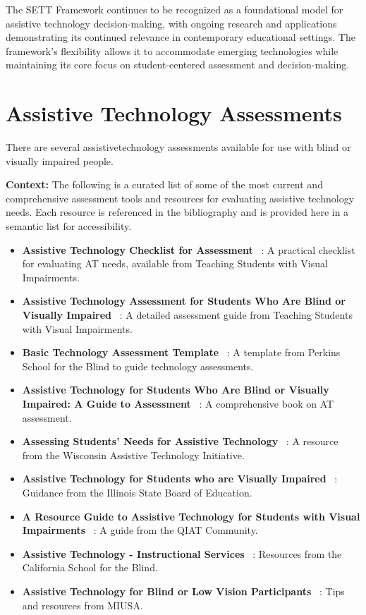 The SETT Framework continues to be recognized as a foundational model for assistive technology decision-making, with ongoing research and applications demonstrating its continued relevance in contemporary educational settings. The framework's flexibility allows it to accommodate emerging technologies while maintaining its core focus on student-centered assessment and decision-making.

\section{Assistive Technology Assessments}\label{app3:trouble4}
There are several \gls{assistivetechnology} assessments available for use with blind or visually impaired people.

\noindent
\textbf{Context:} The following is a curated list of some of the most current and comprehensive assessment tools and resources for evaluating assistive technology needs. Each resource is referenced in the bibliography and is provided here in a semantic list for accessibility.

\begin{itemize}
	\item \textbf{Assistive Technology Checklist for Assessment}~ \supercite{SnowChecklist}: A practical checklist for evaluating AT needs, available from Teaching Students with Visual Impairments.
	\item \textbf{Assistive Technology Assessment for Students Who Are Blind or Visually Impaired}~ \supercite{TeachingAssessment}: A detailed assessment guide from Teaching Students with Visual Impairments.
	\item \textbf{Basic Technology Assessment Template}~ \supercite{PerkinsTemplate}: A template from Perkins School for the Blind to guide technology assessments.
	\item \textbf{Assistive Technology for Students Who Are Blind or Visually Impaired: A Guide to Assessment}~ \supercite{PresleyGuide}: A comprehensive book on AT assessment.
	\item \textbf{Assessing Students' Needs for Assistive Technology}~ \supercite{WATIAssessing}: A resource from the Wisconsin Assistive Technology Initiative.
	\item \textbf{Assistive Technology for Students who are Visually Impaired}~ \supercite{ISBEAssistive}: Guidance from the Illinois State Board of Education.
	\item \textbf{A Resource Guide to Assistive Technology for Students with Visual Impairments}~ \supercite{QIATGuide}: A guide from the QIAT Community.
	\item \textbf{Assistive Technology - Instructional Services}~ \supercite{CSBInstruction}: Resources from the California School for the Blind.
	\item \textbf{Assistive Technology for Blind or Low Vision Participants}~ \supercite{MIUSATips}: Tips and resources from MIUSA.
\end{itemize}

